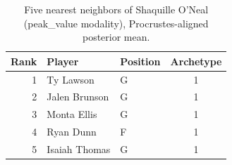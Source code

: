 \begin{table}[htbp]
  \centering\small
  \begin{tabular}{rllc}
    \toprule
    Rank & Player & Position & Archetype \\
    \midrule
    1 & Ty Lawson & G & 1 \\
    2 & Jalen Brunson & G & 1 \\
    3 & Monta Ellis & G & 1 \\
    4 & Ryan Dunn & F & 1 \\
    5 & Isaiah Thomas & G & 1 \\
    \bottomrule
  \end{tabular}
  \caption{Five nearest neighbors of Shaquille O'Neal (peak_value modality), Procrustes-aligned posterior mean.}
  \label{tab:Shaquille_O_Neal_neighbors_peak_value}
\end{table}

